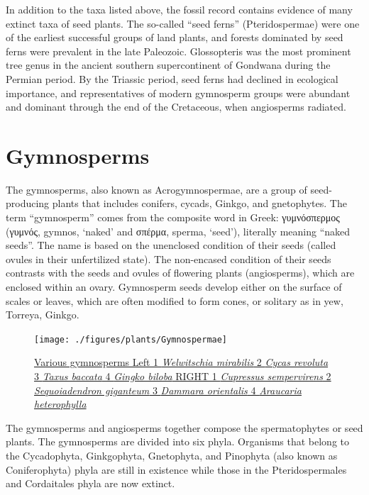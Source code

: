 In addition to the taxa listed above, the fossil record contains evidence of many extinct taxa of seed plants. The so-called ``seed ferns'' (Pteridospermae) were one of the earliest successful groups of land plants, and forests dominated by seed ferns were prevalent in the late Paleozoic. Glossopteris was the most prominent tree genus in the ancient southern supercontinent of Gondwana during the Permian period. By the Triassic period, seed ferns had declined in ecological importance, and representatives of modern gymnosperm groups were abundant and dominant through the end of the Cretaceous, when angiosperms radiated.

\hypertarget{gymnosperms}{%
\section{Gymnosperms}\label{gymnosperms}}

The gymnosperms, also known as Acrogymnospermae, are a group of seed-producing plants that includes conifers, cycads, Ginkgo, and gnetophytes. The term ``gymnosperm'' comes from the composite word in Greek: γυμνόσπερμος (γυμνός, gymnos, `naked' and σπέρμα, sperma, `seed'), literally meaning ``naked seeds''. The name is based on the unenclosed condition of their seeds (called ovules in their unfertilized state). The non-encased condition of their seeds contrasts with the seeds and ovules of flowering plants (angiosperms), which are enclosed within an ovary. Gymnosperm seeds develop either on the surface of scales or leaves, which are often modified to form cones, or solitary as in yew, Torreya, Ginkgo.



\begin{figure}

{\centering \texttt{[image: ./figures/plants/Gymnospermae]} 

}

\caption{\href{https://commons.wikimedia.org/wiki/File:Gymnospermae.jpg}{Various gymnosperms Left 1 \emph{Welwitschia mirabilis} 2 \emph{Cycas revoluta} 3 \emph{Taxus baccata} 4 \emph{Gingko biloba} RIGHT 1 \emph{Cupressus sempervirens} 2 \emph{Sequoiadendron giganteum} 3 \emph{Dammara orientalis} 4 \emph{Araucaria heterophylla}}}\label{fig:varioousgymnosperms}
\end{figure}

The gymnosperms and angiosperms together compose the spermatophytes or seed plants. The gymnosperms are divided into six phyla. Organisms that belong to the Cycadophyta, Ginkgophyta, Gnetophyta, and Pinophyta (also known as Coniferophyta) phyla are still in existence while those in the Pteridospermales and Cordaitales phyla are now extinct.

